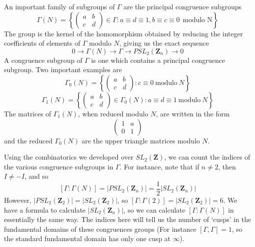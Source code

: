An important family of subgroups of $\Gamma$ are the principal congruence subgroups
%
\[ \Gamma(N) = \left\{ \begin{pmatrix} a & b \\ c & d \end{pmatrix} \in \Gamma : a \equiv d \equiv 1, b \equiv c \equiv 0\ \ \text{modulo N} \right\} \]
%
The group is the kernel of the homomorphism obtained by reducing the integer coefficients of elements of $\Gamma$ modulo $N$, giving us the exact sequence
%
\[ 0 \to \Gamma(N) \to \Gamma \to PSL_2(\mathbf{Z}_n) \to 0 \]
%
A congruence subgroup of $\Gamma$ is one which contains a principal congruence subgroup. Two important examples are
%
\[ \Gamma_0(N) = \left\{ \begin{pmatrix} a & b \\ c & d \end{pmatrix} : c \equiv 0\ \text{modulo}\ N \right\} \]
\[ \Gamma_1(N) = \left\{ \begin{pmatrix} a & b \\ c & d \end{pmatrix} \in \Gamma_0(N) : a \equiv d \equiv 1\ \text{modulo}\ N \right\} \]
%
The matrices of $\Gamma_1(N)$, when reduced modulo $N$, are written in the form
%
\[ \begin{pmatrix} 1 & a \\ 0 & 1 \end{pmatrix} \]
%
and the reduced $\Gamma_0(N)$ are the upper triangle matrices modulo $N$.

Using the combinatorics we developed over $SL_2(\mathbf{Z})$, we can count the indices of the various congruence subgroups in $\Gamma$. For instance, note that if $n \neq 2$, then $I \neq -I$, and so
%
\[ [\Gamma: \Gamma(N)] = |PSL_2(\mathbf{Z}_n)| = \frac{1}{2} |SL_2(\mathbf{Z}_n)| \]
%
However, $|PSL_2(\mathbf{Z}_2)| = |SL_2(\mathbf{Z}_2)|$, so $[\Gamma: \Gamma(2)] = |SL_2(\mathbf{Z}_2)| = 6$. We have a formula to calculate $|SL_2(\mathbf{Z}_n)|$, so we can calculate $[\Gamma: \Gamma(N)]$ in essentially the same way. The indices here will tell us the number of `cusps' in the fundamental domains of these congruences groups (For instance $[\Gamma, \Gamma] = 1$, so the standard fundamental domain has only one cusp at $\infty$).

